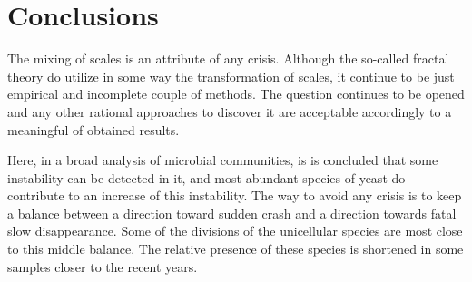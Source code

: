 \documentclass[a4paper]{article}
\begin{document}






\section*{Conclusions}

The mixing of scales is an attribute of any crisis. Although the so-called fractal theory do utilize in some way the transformation of scales, it continue to be just empirical and incomplete couple of methods. The question continues to be opened and any other rational approaches to discover it are acceptable accordingly to a meaningful of obtained results.

Here, in a broad analysis of microbial communities, is is concluded that some instability can be detected in it, and most abundant species of yeast do contribute to an increase of this instability. The way to avoid any crisis is to keep a balance between a direction toward sudden crash and a direction towards fatal slow disappearance. Some of the divisions of the unicellular species are most close to this middle balance. The relative presence of these species is shortened in some samples closer to the recent years.


\end{document}
